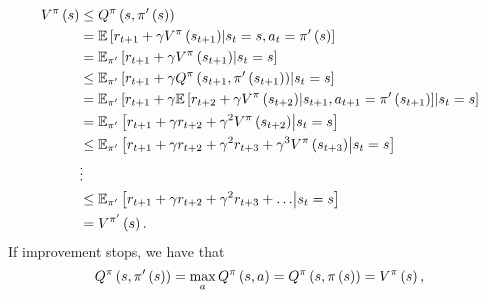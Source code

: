 \begin{align}
	\statevalue\policyscript\left(\state\right)
		&\leq\actionvalue\policyscript\left(\state,\policy'\left(\state\right)\right) \notag \\
		&=\mathbb{E}\left[\randomreward_{\timestep+1}+\discount\statevalue\policyscript\left(\randomstate_{\timestep+1}\right)\middle\vert\randomstate_{\timestep}=\state,\randomaction_{\timestep}=\policy'\left(\state\right)\right] \notag \\
		&=\mathbb{E}_{\policy'}\left[\randomreward_{\timestep+1}+\discount\statevalue\policyscript\left(\randomstate_{\timestep+1}\right)\middle\vert\randomstate_{\timestep}=\state\right] \notag \\
		&\leq\mathbb{E}_{\policy'}\left[\randomreward_{\timestep+1}+\discount\actionvalue\policyscript\left(\randomstate_{\timestep+1},\policy'\left(\randomstate_{\timestep+1}\right)\right)\middle\vert\randomstate_{\timestep}=\state\right] \notag \\
		&=\mathbb{E}_{\policy'}\left[\randomreward_{\timestep+1}+\discount\mathbb{E}\left[\randomreward_{\timestep+2}+\discount\statevalue\policyscript\left(\randomstate_{\timestep+2}\right)\middle\vert\randomstate_{\timestep+1},\randomaction_{\timestep+1}=\policy'\left(\randomstate_{\timestep+1}\right)\right]\middle\vert\randomstate_{\timestep}=\state\right] \notag \\
		&=\mathbb{E}_{\policy'}\left[\randomreward_{\timestep+1}+\discount\randomreward_{\timestep+2}+\discount^{2}\statevalue\policyscript\left(\randomstate_{\timestep+2}\right)\middle\vert\randomstate_{\timestep}=\state\right] \notag \\
		&\leq\mathbb{E}_{\policy'}\left[\randomreward_{\timestep+1}+\discount\randomreward_{\timestep+2}+\discount^{2}\randomreward_{\timestep+3}+\discount^{3}\statevalue\policyscript\left(\randomstate_{\timestep+3}\right)\middle\vert\randomstate_{\timestep}=\state\right] \notag \\
		&\vdots \notag \\
		&\leq\mathbb{E}_{\policy'}\left[\randomreward_{\timestep+1}+\discount\randomreward_{\timestep+2}+\discount^{2}\randomreward_{\timestep+3}+\dots\middle\vert\randomstate_{\timestep}=\state\right] \notag \\
		&=\statevalue\script{\policy'}\left(\state\right).
\end{align}
If improvement stops, we have that
\begin{equation}
	\actionvalue\policyscript\left(\state,\policy'\left(\state\right)\right)=\max_{\action}\actionvalue\policyscript\left(\state,\action\right) =
	\actionvalue\policyscript\left(\state,\policy\left(\state\right)\right)=\statevalue\policyscript\left(\state\right),
\end{equation}
